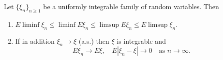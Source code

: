 Let $\{\xi_n\}_{n \geq 1}$ be a uniformly integrable family of random variables. Then
\begin{enumerate}
\item[(a)] $E \liminf \xi_n \leq \liminf E\xi_n \leq \limsup E\xi_n \leq E \limsup \xi_n$.
\item[(b)] If in addition $\xi_n \to \xi$ (a.s.) then $\xi$ is integrable and
  $$E\xi_n \to E\xi, \quad E|\xi_n - \xi| \to 0 \quad \text{as } n \to \infty.$$
\end{enumerate}
